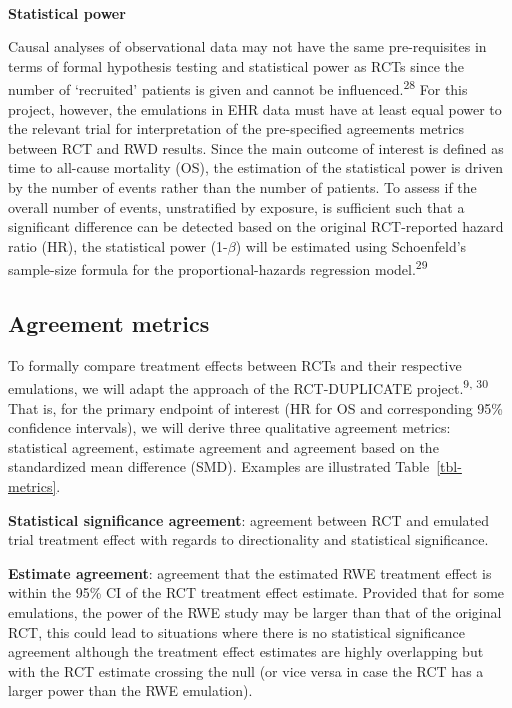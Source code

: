 \documentclass[
  letterpaper,
  DIV=11,
  numbers=noendperiod]{scrartcl}
\makeatletter
\let\oldparagraph\paragraph
\renewcommand{\paragraph}{
    \@ifstar
      \xxxParagraphStar
      \xxxParagraphNoStar
  }
\newcommand{\xxxParagraphStar}[1]{\oldparagraph*{#1}\mbox{}}
\newcommand{\xxxParagraphNoStar}[1]{\oldparagraph{#1}\mbox{}}
\makeatother
\begin{document}
\paragraph{\texorpdfstring{\textbf{Statistical
power}}{Statistical power}}\label{statistical-power}

Causal analyses of observational data may not have the same
pre-requisites in terms of formal hypothesis testing and statistical
power as RCTs since the number of `recruited' patients is given and
cannot be influenced.\textsuperscript{28} For this project, however, the
emulations in EHR data must have at least equal power to the relevant
trial for interpretation of the pre-specified agreements metrics between
RCT and RWD results. Since the main outcome of interest is defined as
time to all-cause mortality (OS), the estimation of the statistical
power is driven by the number of events rather than the number of
patients. To assess if the overall number of events, unstratified by
exposure, is sufficient such that a significant difference can be
detected based on the original RCT-reported hazard ratio (HR), the
statistical power (1-\(\beta\)) will be estimated using Schoenfeld's
sample-size formula for the proportional-hazards regression
model.\textsuperscript{29}

\subsection{Agreement metrics}\label{sec-agreement-metrics}

To formally compare treatment effects between RCTs and their respective
emulations, we will adapt the approach of the RCT-DUPLICATE
project.\textsuperscript{9, 30} That is, for the primary endpoint of
interest (HR for OS and corresponding 95\% confidence intervals), we
will derive three qualitative agreement metrics: statistical agreement,
estimate agreement and agreement based on the standardized mean
difference (SMD). Examples are illustrated Table~\ref{tbl-metrics}.

\textbf{Statistical significance agreement}: agreement between RCT and
emulated trial treatment effect with regards to directionality and
statistical significance.

\textbf{Estimate agreement}: agreement that the estimated RWE treatment
effect is within the 95\% CI of the RCT treatment effect estimate.
Provided that for some emulations, the power of the RWE study may be
larger than that of the original RCT, this could lead to situations
where there is no statistical significance agreement although the
treatment effect estimates are highly overlapping but with the RCT
estimate crossing the null (or vice versa in case the RCT has a larger
power than the RWE emulation).
\end{document}
